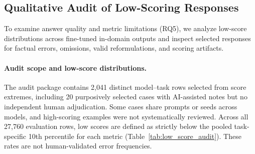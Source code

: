 \documentclass[a4paper,fleqn]{cas-sc}
\begin{document}



\subsection{Qualitative Audit of Low-Scoring Responses}
\label{sec:qualitative_audit}

To examine answer quality and metric limitations (RQ5), we analyze low-score distributions across fine-tuned in-domain outputs and inspect selected responses for factual errors, omissions, valid reformulations, and scoring artifacts.

\paragraph{Audit scope and low-score distributions.}
The audit package contains 2,041 distinct model--task rows selected from score extremes, including 20 purposively selected cases with AI-assisted notes but no independent human adjudication. Some cases share prompts or seeds across models, and high-scoring examples were not systematically reviewed. Across all 27,760 evaluation rows, low scores are defined as strictly below the pooled task-specific 10th percentile for each metric (Table~\ref{tab:low_score_audit}). These rates are not human-validated error frequencies.
\end{document}
